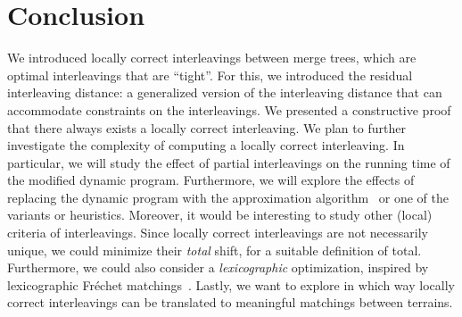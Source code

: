 \documentclass[11pt]{article}
\begin{document}
\section{Conclusion}\label{sec:conclusion}
We introduced locally correct interleavings between merge trees, which are optimal interleavings that are ``tight''.
For this, we introduced the residual interleaving distance: a generalized version of the interleaving distance that can accommodate constraints on the interleavings.
We presented a constructive proof that there always exists a locally correct interleaving.
%
We plan to further investigate the complexity of computing a locally correct interleaving.
In particular, we will study the effect of partial interleavings on the running time of the modified dynamic program.
Furthermore, we will explore the effects of replacing the dynamic program with the approximation algorithm~\cite{agarwal2018computing} or one of the variants or heuristics.
Moreover, it would be interesting to study other (local) criteria of interleavings.
Since locally correct interleavings are not necessarily unique, we could minimize their \emph{total} shift, for a suitable definition of total.
Furthermore, we could also consider a \emph{lexicographic} optimization, inspired by lexicographic Fréchet matchings~\cite{rote2014lexicographic}.
Lastly, we want to explore in which way locally correct interleavings can be translated to meaningful matchings between terrains.
%



\end{document}
